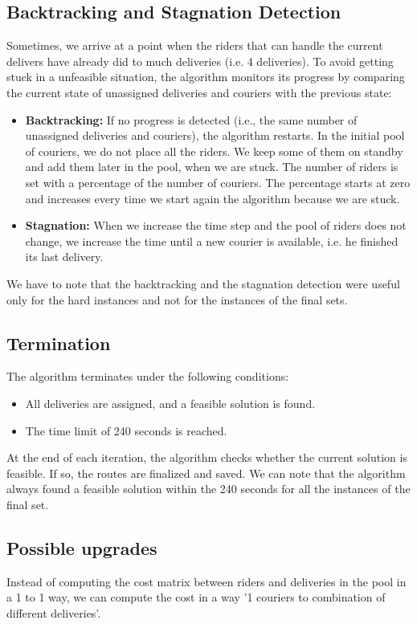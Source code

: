 \documentclass[a4paper]{article}
\begin{document}
\subsection{Backtracking and Stagnation Detection}
Sometimes, we arrive at a point when the riders that can handle the current delivers have already did to much deliveries (i.e. 4 deliveries). To avoid getting stuck in a unfeasible situation, the algorithm monitors its progress by comparing the current state of unassigned deliveries and couriers with the previous state:
\begin{itemize}
    \item \textbf{Backtracking:} If no progress is detected (i.e., the same number of unassigned deliveries and couriers), the algorithm restarts. In the initial pool of couriers, we do not place all the riders. We keep some of them on standby and add them later in the pool, when we are stuck. The number of  riders is set with a percentage of the number of couriers. The percentage starts at zero and increases every time we start again the algorithm because we are stuck.
    \item \textbf{Stagnation:} When we increase the time step and the pool of riders does not change, we increase the time until a new courier is available, i.e. he finished its last delivery.
\end{itemize}
We have to note that the backtracking and the stagnation detection were useful only for the hard instances and not for the instances of the final sets.
\subsection{Termination}
The algorithm terminates under the following conditions:
\begin{itemize}
    \item All deliveries are assigned, and a feasible solution is found.
    \item The time limit of 240 seconds is reached.
\end{itemize}
At the end of each iteration, the algorithm checks whether the current solution is feasible. If so, the routes are finalized and saved. We can note that the algorithm always found a feasible solution within the 240 seconds for all the instances of the final set.

\subsection{Possible upgrades}
Instead of computing the cost matrix between riders and deliveries in the pool in a 1 to 1 way, we can compute the cost in a way '1 couriers to combination of different deliveries'.
\end{document}
